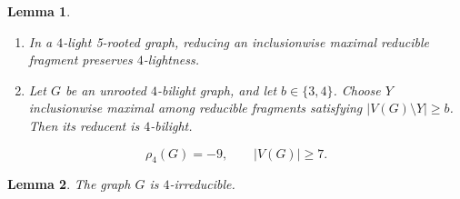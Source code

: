 \documentclass[10pt,a4paper]{amsart}
\newtheorem{lemma}{Lemma}
\begin{document}
\begin{lemma}\label{lem:stability}
\begin{enumerate}
\item In a $4$-light 5-rooted graph, reducing an inclusionwise maximal reducible fragment preserves $4$-lightness.
\item Let $G$ be an unrooted $4$-bilight graph, and let $b\in\{3,4\}$. Choose $Y$ inclusionwise maximal among reducible fragments satisfying $|V(G)\setminus Y|\ge b$. Then its reducent is $4$-bilight.
\end{enumerate}
\end{lemma}

\begin{equation}\label{eq:criticaldensity}
\rho_4(G)=-9,\qquad |V(G)|\ge7.
\end{equation}

\begin{lemma}\label{lem:criticalirreducible}
The graph $G$ is $4$-irreducible.
\end{lemma}
\end{document}
